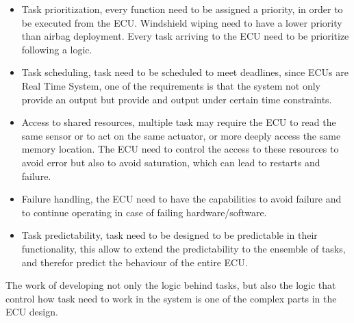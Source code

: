 \documentclass[../main.tex]{subfiles}
\begin{document}
\begin{itemize}
    \item Task prioritization, every function need to be assigned a priority, in order to be executed from the ECU. Windshield wiping need to have a lower priority than airbag deployment. Every task arriving to the ECU need to be prioritize following a logic. 
    \item Task scheduling, task need to be scheduled to meet deadlines, since ECUs are Real Time System, one of the requirements is that the system not only provide an output but provide and output under certain time constraints. 
    \item Access to shared resources, multiple task may require the ECU to read the same sensor or to act on the same actuator, or more deeply access the same memory location. The ECU need to control the access to these resources to avoid error but also to avoid saturation, which can lead to restarts and failure.  
    \item Failure handling, the ECU need to have the capabilities to avoid failure and to continue operating in case of failing hardware/software.
    \item Task predictability, task need to be designed to be predictable in their functionality, this allow to extend the predictability to the ensemble of tasks, and therefor predict the behaviour of the entire ECU. 
\end{itemize}
The work of developing not only the logic behind tasks, but also the logic that control how task need to work in the system is one of the complex parts in the ECU design. 
\end{document}

